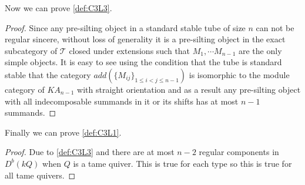 \indent Now we can prove \ref{def:C3L3}.
\begin{proof}
\indent Since any pre-silting object in a standard stable tube of size $n$ can not be regular sincere, without loss of generality it is a pre-silting object in the exact subcategory of $\mathcal{T}$ closed under extensions such that $M_1,\cdots M_{n-1}$ are the only simple objects. It is easy to see using the condition that the tube is standard stable that the category $add(\{M_{ij}\}_{1\leq i < j\leq n-1})$ is isomorphic to the module category of $KA_{n-1}$ with straight orientation and as a result any pre-silting object with all indecomposable summands in it or its shifts has at most $n-1$ summands. 
\end{proof}
\indent Finally we can prove \ref{def:C3L1}.
\begin{proof}
\indent Due to \ref{def:C3L3} and \cite{DR76} there are at most $n-2$ regular components in $D^b(kQ)$ when $Q$ is a tame quiver. This is true for each type so this is true for all tame quivers.
\end{proof}
